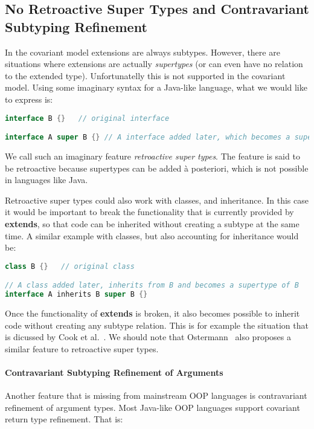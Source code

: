 \subsection{No Retroactive Super Types and Contravariant Subtyping Refinement}

In the covariant model extensions are always subtypes. However, 
there are situations where extensions are actually
\emph{supertypes} (or can even have no relation to the extended type). Unfortunatelly this is not supported in the
covariant model. Using some imaginary syntax for a Java-like language, 
what we would like to express is:

\begin{lstlisting}[language=java]
interface B {}   // original interface

interface A super B {} // A interface added later, which becomes a supertype of B
\end{lstlisting}

\noindent We call such an imaginary feature \emph{retroactive super
  types}. The feature is said to be retroactive because supertypes can
be added \`a posteriori, which is not possible in languages like Java.

Retroactive super types could also work with classes, and
inheritance. In this case it would be important to break the
functionality that is currently provided by {\bf extends}, so that 
code can be inherited without creating a subtype at the same time. 
A similar example with classes, but also accounting for inheritance 
would be:

\begin{lstlisting}[language=java]
class B {}   // original class

// A class added later, inherits from B and becomes a supertype of B
interface A inherits B super B {} 
\end{lstlisting}

\noindent Once the functionality of {\bf extends} is broken, it also
becomes possible to inherit code without creating any subtype
relation. This is for example the situation that is dicussed by Cook
et al.~\cite{}. We should note that Ostermann~\cite{}
also proposes a similar feature to retroactive super types.

\paragraph{Contravariant Subtyping Refinement of Arguments}
Another feature that is missing from mainstream OOP languages is 
contravariant refinement of argument types. Most Java-like OOP languages support covariant return type 
refinement. That is:

